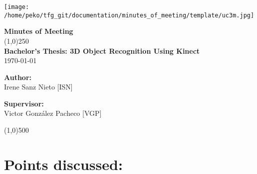 \documentclass{article}
\newenvironment{myindentpar}[1]%
 {\begin{list}{}%
         {\setlength{\leftmargin}{#1}}%
         \item[]%
 }
 {\end{list}}
\begin{document}
\texttt{[image: /home/peko/tfg\_git/documentation/minutes\_of\_meeting/template/uc3m.jpg]}

\vspace{-1cm}
\begin{minipage}[b]{1\linewidth}
	\begin{center}
	{\Huge \bfseries{Minutes of Meeting}}\\
	\line(1,0){250}\\[1cm]
	{\LARGE \textbf{Bachelor's Thesis: 3D Object Recognition Using Kinect}}\\[0.5cm]
	{\large \today}
	\end{center}
\end {minipage}



\begin{minipage}{0.55\textwidth}
\begin{flushleft} \large
\textbf{{Author:}\\}
Irene Sanz Nieto [ISN]\\
\end{flushleft}
\end{minipage}
\begin{minipage}{0.4\textwidth}
\begin{flushright} \large
\textbf{Supervisor: }\\
Victor González Pacheco [VGP]
\end{flushright}\end{minipage}

\begin{center}
\line(1,0){500}
\end{center}

\renewcommand{\thesubsection}
{\hspace*{1cm} \arabic{section}.\arabic{subsection}}



\section{\LARGE Points discussed: }
	\subsection{}
		\begin{myindentpar}{1cm} 
		
		\end{myindentpar}
\end{document}
